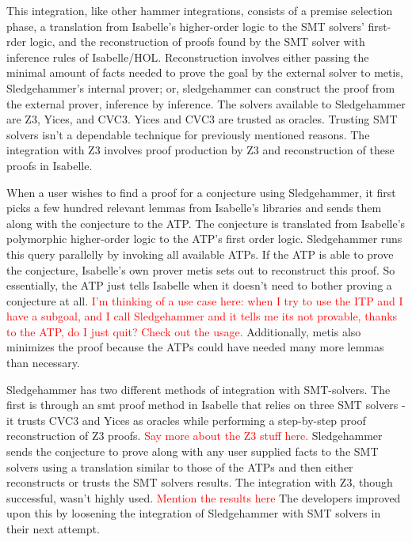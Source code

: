 \documentclass{article}
\begin{document}
	This integration, like other hammer integrations, 
	consists of a premise selection phase, a translation 
	from Isabelle's higher-order logic to the SMT solvers'
	first-rder logic, and the reconstruction of proofs found by the SMT solver with inference rules of Isabelle/HOL. 
	Reconstruction involves either passing the minimal 
	amount of facts needed to prove the goal by the 
	external solver to metis, Sledgehammer's internal 
	prover; or, sledgehammer can construct the proof 
	from the external prover, inference by inference.
	The solvers available to Sledgehammer are Z3, Yices, 
	and CVC3. Yices and CVC3 are trusted as oracles.
	Trusting SMT solvers isn't a dependable 
	technique for previously mentioned reasons. The 
	integration with Z3 involves proof production by 
	Z3 and reconstruction of these proofs in Isabelle.
	
	When a user wishes to find a proof for a conjecture using 
	Sledgehammer, it first picks a few hundred relevant 
	lemmas from Isabelle's libraries and sends them along 
	with the conjecture to the ATP. The conjecture is 
	translated from Isabelle's polymorphic higher-order 
	logic to the ATP's first order logic. Sledgehammer 
	runs this query parallelly by invoking all available 
	ATPs. If the ATP is able to prove the conjecture, 
	Isabelle's own prover metis sets out to reconstruct 
	this proof. So essentially, the ATP just tells Isabelle 
	when it doesn't need to bother proving a conjecture at 
	all. \textcolor{red}{I'm thinking of a use case here: 
	when I try to use the ITP and I have a subgoal, and I 
	call Sledgehammer and it tells me its not provable, 
	thanks to the ATP, do I just quit? Check out the usage.}
	Additionally, metis also minimizes the proof because 
	the ATPs could have needed many more lemmas than necessary.
	
	Sledgehammer has two different methods of integration 
	with SMT-solvers. The first is through an smt proof 
	method in Isabelle that relies on three SMT solvers - 
	it trusts CVC3 and Yices as oracles while performing 
	a step-by-step proof reconstruction of Z3 proofs. 
	\textcolor{red}{Say more about the Z3 stuff here.}
	Sledgehammer sends the conjecture to prove along 
	with any user supplied facts to the SMT solvers 
	using a translation similar to those of the ATPs 
	and then either reconstructs or trusts the SMT solvers
	results.  The integration
	with Z3, though successful, wasn't highly used. 
	\textcolor{red}{Mention the results here} The developers
	improved upon this by loosening the integration of 
	Sledgehammer with SMT solvers in their next attempt.
	
\end{document}
